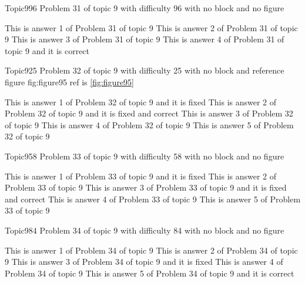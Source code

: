 \documentclass[master]{exam}
\begin{document}
\begin{problem}{Topic9}{96}
	Problem 31 of topic 9 with difficulty 96 with no block and no figure
	\begin{answers}
		\answer This is answer 1 of Problem 31 of topic 9 
		\answer This is answer 2 of Problem 31 of topic 9 
		\answer This is answer 3 of Problem 31 of topic 9 
		\answer[correct] This is answer 4 of Problem 31 of topic 9 and it is correct
	\end{answers}
\end{problem}

\begin{problem}{Topic9}{25}
	Problem 32 of topic 9 with difficulty 25 with no block and reference figure fig:figure95 ref is \ref{fig:figure95}
	\begin{answers}
		\answer[fixed] This is answer 1 of Problem 32 of topic 9 and it is fixed
		 This is answer 2 of Problem 32 of topic 9 and it is fixed and correct
		\answer This is answer 3 of Problem 32 of topic 9 
		\answer This is answer 4 of Problem 32 of topic 9 
		\answer This is answer 5 of Problem 32 of topic 9 
	\end{answers}
\end{problem}

\begin{problem}{Topic9}{58}
	Problem 33 of topic 9 with difficulty 58 with no block and no figure
	\begin{answers}
		\answer[fixed] This is answer 1 of Problem 33 of topic 9 and it is fixed
		\answer This is answer 2 of Problem 33 of topic 9 
		 This is answer 3 of Problem 33 of topic 9 and it is fixed and correct
		\answer This is answer 4 of Problem 33 of topic 9 
		\answer This is answer 5 of Problem 33 of topic 9 
	\end{answers}
\end{problem}

\begin{problem}{Topic9}{84}
	Problem 34 of topic 9 with difficulty 84 with no block and no figure
	\begin{answers}
		\answer This is answer 1 of Problem 34 of topic 9 
		\answer This is answer 2 of Problem 34 of topic 9 
		\answer[fixed] This is answer 3 of Problem 34 of topic 9 and it is fixed
		\answer This is answer 4 of Problem 34 of topic 9 
		\answer[correct] This is answer 5 of Problem 34 of topic 9 and it is correct
	\end{answers}
\end{problem}
\end{document}
